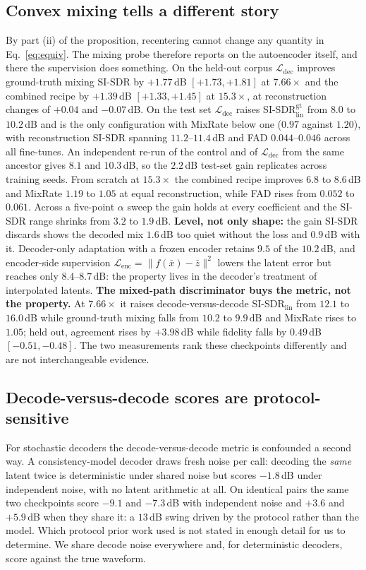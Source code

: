 \documentclass[conference]{IEEEtran}
\newcommand{\Ldec}{\mathcal{L}_\mathrm{dec}}
\newcommand{\Lenc}{\mathcal{L}_\mathrm{enc}}
\begin{document}
\subsection{Convex mixing tells a different story}\label{sec:mixing}
By part (ii) of the proposition, recentering cannot change any quantity in
Eq.~\ref{eq:equiv}. The mixing probe therefore reports on the autoencoder
itself, and there the supervision does something. On the held-out corpus
$\Ldec$ improves ground-truth mixing SI-SDR by $+1.77$\,dB $[+1.73,+1.81]$ at
$7.66\times$ and the combined recipe by $+1.39$\,dB $[+1.33,+1.45]$ at
$15.3\times$, at reconstruction changes of $+0.04$ and $-0.07$\,dB. On the
test set $\Ldec$ raises SI-SDR$_\mathrm{lin}^\mathrm{gt}$ from $8.0$ to
$10.2$\,dB and is the only configuration with MixRate below one ($0.97$
against $1.20$), with reconstruction SI-SDR spanning $11.2$--$11.4$\,dB and
FAD $0.044$--$0.046$ across all fine-tunes. An independent re-run of the
control and of $\Ldec$ from the same ancestor gives $8.1$ and $10.3$\,dB, so
the $2.2$\,dB test-set gain replicates across training seeds. From scratch at
$15.3\times$ the combined recipe improves $6.8$ to $8.6$\,dB and MixRate
$1.19$ to $1.05$ at equal reconstruction, while FAD rises from $0.052$ to
$0.061$. Across a five-point $\alpha$ sweep the gain holds at every
coefficient and the SI-SDR range shrinks from $3.2$ to $1.9$\,dB.
\textbf{Level, not only shape:} the gain SI-SDR discards shows the decoded
mix $1.6$\,dB too quiet without the loss and $0.9$\,dB with it. Decoder-only
adaptation with a frozen encoder retains $9.5$ of the $10.2$\,dB, and
encoder-side supervision $\Lenc=\lVert f(\bar{x})-\bar{z}\rVert^2$ lowers the
latent error but reaches only $8.4$--$8.7$\,dB: the property lives in the
decoder's treatment of interpolated latents.
\textbf{The mixed-path discriminator buys the metric, not the property.} At
$7.66\times$ it raises decode-versus-decode SI-SDR$_\mathrm{lin}$ from
$12.1$ to $16.0$\,dB while ground-truth mixing falls from $10.2$ to $9.9$\,dB
and MixRate rises to $1.05$; held out, agreement rises by $+3.98$\,dB while
fidelity falls by $0.49$\,dB $[-0.51,-0.48]$. The two measurements rank these
checkpoints differently and are not interchangeable evidence.

\subsection{Decode-versus-decode scores are protocol-sensitive}\label{sec:protocol}
For stochastic decoders the decode-versus-decode metric is confounded a
second way. A consistency-model decoder \cite{pasini2024music2latent} draws
fresh noise per call: decoding the \emph{same} latent twice is deterministic
under shared noise but scores $-1.8$\,dB under independent noise, with no
latent arithmetic at all. On identical pairs the same two checkpoints score
$-9.1$ and $-7.3$\,dB with independent noise and $+3.6$ and $+5.9$\,dB when
they share it: a $13$\,dB swing driven by the protocol rather than the model.
Which protocol prior work used is not stated in enough detail for us to
determine. We share decode noise everywhere and, for deterministic decoders,
score against the true waveform.
\end{document}

